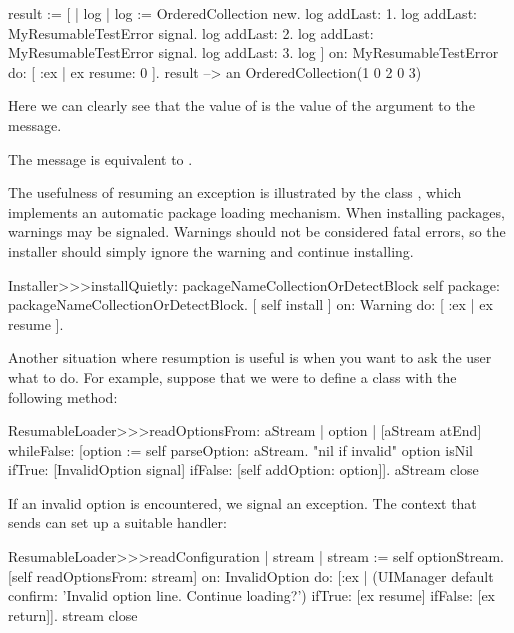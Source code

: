 \documentclass[a4paper,10pt,twoside]{book}
\begin{document}
\begin{code}{}
result := [ | log |
	log := OrderedCollection new.
	log addLast: 1.
	log addLast: MyResumableTestError signal. 
	log addLast: 2.
	log addLast: MyResumableTestError signal.
	log addLast: 3.
	log ] 
		on: MyResumableTestError 
		do: [ :ex |  ex resume: 0 ].
result --> an OrderedCollection(1 0 2 0 3)
\end{code}
Here we can clearly see that the value of  is the value of the argument to the  message.

The message  is equivalent to .

The usefulness of resuming an exception is illustrated by the class , which implements an automatic package loading mechanism. When installing packages, warnings may be signaled. Warnings should not be considered fatal errors, so the installer should simply ignore the warning and continue installing. 

\begin{code}{}
Installer>>>installQuietly: packageNameCollectionOrDetectBlock 
	self package: packageNameCollectionOrDetectBlock. 
	 [ self install ] on: Warning do: [ :ex | ex resume ]. 
\end{code}

Another situation where resumption is useful is when you want to ask the user what to do.  For example, suppose that we were to define a class  with the following method:
\begin{code}{}
ResumableLoader>>>readOptionsFrom: aStream 
	| option |
	[aStream atEnd]
		whileFalse: [option := self parseOption: aStream.
			"nil if invalid"
			option isNil
				ifTrue: [InvalidOption signal]
				ifFalse: [self addOption: option]].
	aStream close
\end{code}
\noindent
If an invalid option is encountered, we signal an  exception.
The context that sends  can set up a suitable handler:

\begin{code}{}
ResumableLoader>>>readConfiguration
	| stream |
	stream := self optionStream.
	[self readOptionsFrom: stream]
		on: InvalidOption
		do: [:ex | (UIManager default confirm: 'Invalid option line. Continue loading?')
				ifTrue: [ex resume]
				ifFalse: [ex return]].
	stream close
\end{code}
\end{document}

